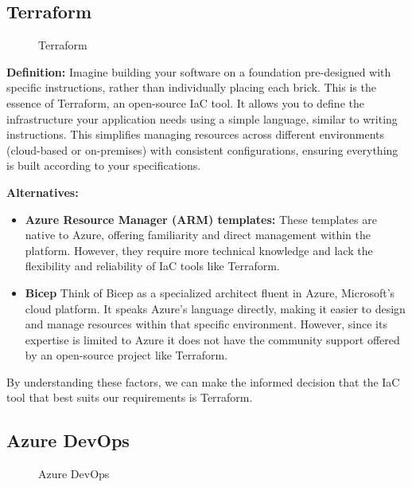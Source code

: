 \subsection*{Terraform}

\begin{figure}[htpb]
    \centering
    \caption{Terraform}
    \label{fig:terraform}
\end{figure}

\textbf{Definition:} Imagine building your software on a foundation pre-designed with specific instructions, rather than individually placing each brick. This is the essence of Terraform, an open-source IaC tool. It allows you to define the infrastructure your application needs using a simple language, similar to writing instructions. This simplifies managing resources across different environments (cloud-based or on-premises) with consistent configurations, ensuring everything is built according to your specifications.
\par
\textbf{Alternatives:}
\begin{itemize}
    \item \textbf{Azure Resource Manager (ARM) templates:} These templates are native to Azure, offering familiarity and direct management within the platform. However, they require more technical knowledge and lack the flexibility and reliability of IaC tools like Terraform.
    \item \textbf{Bicep} Think of Bicep as a specialized architect fluent in Azure, Microsoft's cloud platform. It speaks Azure's language directly, making it easier to design and manage resources within that specific environment. However, since its expertise is limited to Azure it does not have the community support offered by an open-source project like Terraform.
\end{itemize}
By understanding these factors, we can make the informed decision that the IaC tool that best suits our requirements is Terraform.
\subsection*{Azure DevOps}

\begin{figure}[htpb]
    \centering
    \caption{Azure DevOps}
    \label{fig:Azure_DevOps}
\end{figure}

